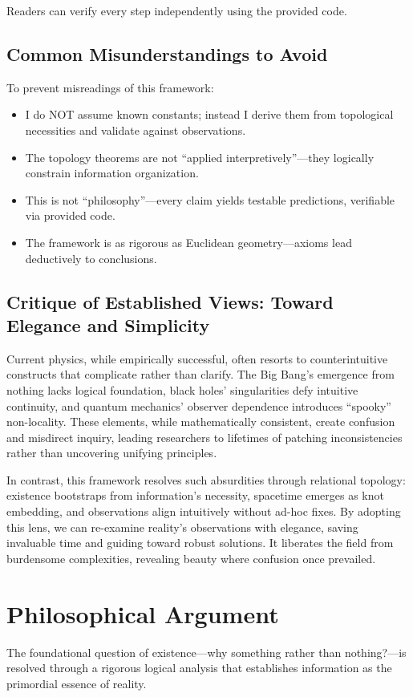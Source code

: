 \documentclass{article}
\begin{document}
Readers can verify every step independently using the provided code.

\subsection{Common Misunderstandings to Avoid}
To prevent misreadings of this framework:
\begin{itemize}
\item I do NOT assume known constants; instead I derive them from topological necessities and validate against observations.
\item The topology theorems are not ``applied interpretively''—they logically constrain information organization.
\item This is not ``philosophy''—every claim yields testable predictions, verifiable via provided code.
\item The framework is as rigorous as Euclidean geometry—axioms lead deductively to conclusions.
\end{itemize}

\subsection{Critique of Established Views: Toward Elegance and Simplicity}
Current physics, while empirically successful, often resorts to counterintuitive constructs that complicate rather than clarify. The Big Bang's emergence from nothing lacks logical foundation, black holes' singularities defy intuitive continuity, and quantum mechanics' observer dependence introduces ``spooky'' non-locality. These elements, while mathematically consistent, create confusion and misdirect inquiry, leading researchers to lifetimes of patching inconsistencies rather than uncovering unifying principles.

In contrast, this framework resolves such absurdities through relational topology: existence bootstraps from information's necessity, spacetime emerges as knot embedding, and observations align intuitively without ad-hoc fixes. By adopting this lens, we can re-examine reality's observations with elegance, saving invaluable time and guiding toward robust solutions. It liberates the field from burdensome complexities, revealing beauty where confusion once prevailed.

\section{Philosophical Argument}
The foundational question of existence—why something rather than nothing?—is resolved through a rigorous logical analysis that establishes information as the primordial essence of reality.
\end{document}
